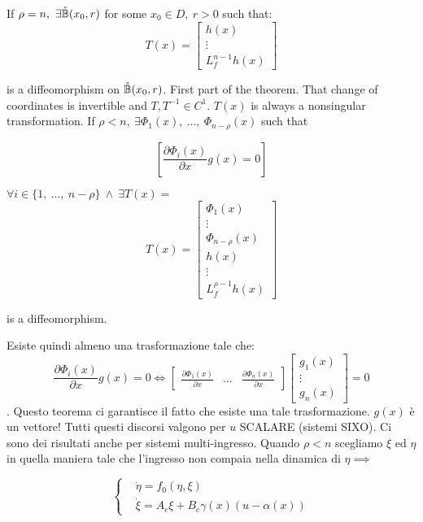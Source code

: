 \begin{thrm}
If $\rho = n,\ \exists \mathring{\mathbb{B}}(x_0,r)$ for some $x_0 \in D,\ r > 0$ such that:
\[
	T(x) = \begin{bmatrix}h(x) \\ \vdots \\ L^{n-1}_fh(x)\end{bmatrix}
\]

is a diffeomorphism on $\mathring{\mathbb{B}}(x_0,r)$. First part of the theorem. That change of coordinates is invertible and $T,T^{-1} \in C^1$. $T(x)$ is always a nonsingular transformation. If $\rho < n,\ \exists \Phi_1(x),\ \dots,\ \Phi_{n-\rho}(x)$ such that

\[
	[\frac{\partial{\Phi_i(x)}}{\partial{x}}g(x) = 0]
\]

$\forall i \in \{1,\ \dots,\ n-\rho\}\ \land\ \exists T(x) =$
\[
	T(x) = \begin{bmatrix}\Phi_1(x) \\ \vdots \\ \Phi_{n-\rho}(x) \\ h(x) \\ \vdots \\ L^{\rho-1}_fh(x)\end{bmatrix}
\]

is a diffeomorphism.
\end{thrm}

Esiste quindi almeno una trasformazione tale che:
\[
	\frac{\partial{\Phi_i(x)}}{\partial{x}}g(x) = 0 \iff \begin{bmatrix}\frac{\partial{\Phi_1(x)}}{\partial{x}} & \dots & \frac{\partial{\Phi_n(x)}}{\partial{x}}\end{bmatrix}\begin{bmatrix}g_1(x)\\ \vdots \\ g_n(x)\end{bmatrix} = 0
\]. Questo teorema ci garantisce il fatto che esiste una tale trasformazione. $g(x)$ è un vettore!
Tutti questi discorsi valgono per $u$ SCALARE (sistemi SIXO). Ci sono dei risultati anche per sistemi multi-ingresso. Quando $\rho < n$ scegliamo $\xi$ ed $\eta$ in quella maniera tale che l'ingresso non compaia nella dinamica di $\eta \implies $
 
\[
	\left\{
	\begin{aligned}
	&\dot{\eta} = f_0(\eta, \xi) \\
	&\dot{\xi} = A_c\xi + B_c\gamma(x)(u-\alpha(x))
	\end{aligned}
	\right.
\]
	
